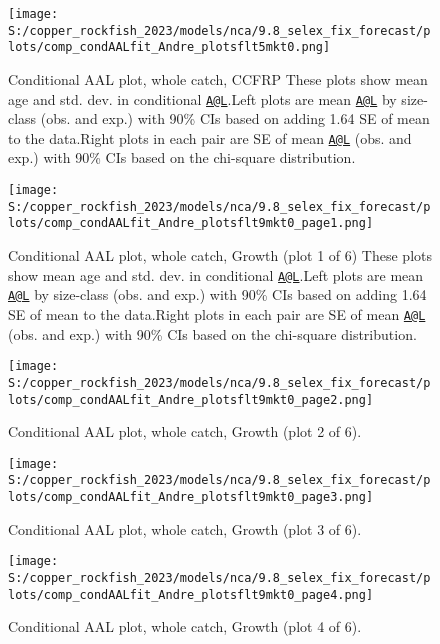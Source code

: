 \documentclass[11pt,
  english,
  letterpaper,
]{article}
\begin{document}
\begin{figure}
\centering
\texttt{[image: S:/copper\_rockfish\_2023/models/nca/9.8\_selex\_fix\_forecast/plots/comp\_condAALfit\_Andre\_plotsflt5mkt0.png]}
\caption{Conditional AAL plot, whole catch, CCFRP These plots show mean age and std. dev. in conditional \href{mailto:A@L}{\nolinkurl{A@L}}.Left plots are mean \href{mailto:A@L}{\nolinkurl{A@L}} by size-class (obs. and exp.) with 90\% CIs based on adding 1.64 SE of mean to the data.Right plots in each pair are SE of mean \href{mailto:A@L}{\nolinkurl{A@L}} (obs. and exp.) with 90\% CIs based on the chi-square distribution.\label{fig:comp_condAALfit_Andre_plotsflt5mkt0}}
\end{figure}

\begin{figure}
\centering
\texttt{[image: S:/copper\_rockfish\_2023/models/nca/9.8\_selex\_fix\_forecast/plots/comp\_condAALfit\_Andre\_plotsflt9mkt0\_page1.png]}
\caption{Conditional AAL plot, whole catch, Growth (plot 1 of 6) These plots show mean age and std. dev. in conditional \href{mailto:A@L}{\nolinkurl{A@L}}.Left plots are mean \href{mailto:A@L}{\nolinkurl{A@L}} by size-class (obs. and exp.) with 90\% CIs based on adding 1.64 SE of mean to the data.Right plots in each pair are SE of mean \href{mailto:A@L}{\nolinkurl{A@L}} (obs. and exp.) with 90\% CIs based on the chi-square distribution.\label{fig:comp_condAALfit_Andre_plotsflt9mkt0_page1}}
\end{figure}

\begin{figure}
\centering
\texttt{[image: S:/copper\_rockfish\_2023/models/nca/9.8\_selex\_fix\_forecast/plots/comp\_condAALfit\_Andre\_plotsflt9mkt0\_page2.png]}
\caption{Conditional AAL plot, whole catch, Growth (plot 2 of 6).\label{fig:comp_condAALfit_Andre_plotsflt9mkt0_page2}}
\end{figure}

\begin{figure}
\centering
\texttt{[image: S:/copper\_rockfish\_2023/models/nca/9.8\_selex\_fix\_forecast/plots/comp\_condAALfit\_Andre\_plotsflt9mkt0\_page3.png]}
\caption{Conditional AAL plot, whole catch, Growth (plot 3 of 6).\label{fig:comp_condAALfit_Andre_plotsflt9mkt0_page3}}
\end{figure}

\begin{figure}
\centering
\texttt{[image: S:/copper\_rockfish\_2023/models/nca/9.8\_selex\_fix\_forecast/plots/comp\_condAALfit\_Andre\_plotsflt9mkt0\_page4.png]}
\caption{Conditional AAL plot, whole catch, Growth (plot 4 of 6).\label{fig:comp_condAALfit_Andre_plotsflt9mkt0_page4}}
\end{figure}
\end{document}
